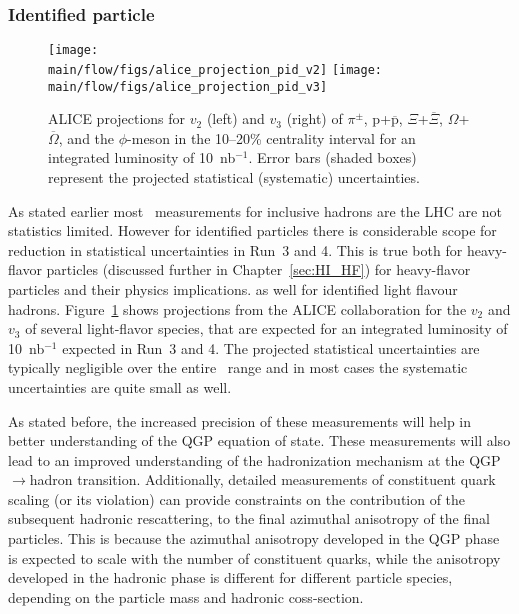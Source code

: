 \subsubsection{Identified particle \vn}\label{sec:identified_particle_vn}


\begin{figure}[!htb]
\begin{center}
\texttt{[image: \\main/flow/figs/alice\_projection\_pid\_v2]}
\texttt{[image: \\main/flow/figs/alice\_projection\_pid\_v3]}
\caption{
ALICE projections for $v_2$ (left) and $v_3$ (right) of $\pi^\pm$, 
  $\mathrm{p}$+$\overline{\mathrm{p}}$, $\Xi$+$\overline{\Xi}$, 
  $\Omega$+$\overline{\Omega}$, and the $\phi$-meson 
  in the 10--20\% centrality interval
  for an integrated luminosity of 10~nb$^{-1}$. 
Error bars (shaded boxes) represent the projected statistical 
  (systematic) uncertainties.}
\label{fig:alice_vn}
\end{center}
\end{figure}

As stated earlier most \vn\ measurements for inclusive hadrons are the LHC 
  are not statistics limited.
However for identified particles there is considerable scope for reduction 
  in statistical uncertainties in Run~3 and 4.
This is true both for heavy-flavor particles (discussed further in Chapter~\ref{sec:HI_HF})
  for heavy-flavor particles and their physics implications. 
  as well for identified light flavour hadrons.
Figure~\ref{fig:alice_vn} shows projections from the ALICE collaboration for 
  the $v_2$ and $v_3$ of several light-flavor species, that are expected for 
  an integrated luminosity of 10~nb$^{-1}$ expected in Run~3 and 4.
The projected statistical uncertainties are typically negligible over the 
  entire \pt\ range and in most cases the systematic uncertainties are 
  quite small as well.

As stated before, the increased precision of these measurements will help in 
  better understanding of the QGP equation of state. 
These measurements will also lead to an improved understanding 
  of the hadronization mechanism at the QGP$\rightarrow$hadron transition.
Additionally, detailed measurements of constituent quark scaling (or its violation)
  can provide constraints on the contribution of the subsequent hadronic 
  rescattering, to the final azimuthal anisotropy of the final particles.
This is because the azimuthal anisotropy developed in the QGP phase 
  is expected to scale with the 
  number of constituent quarks, while the anisotropy developed in the hadronic
  phase is different for different particle species, depending on the particle 
  mass and hadronic coss-section.


